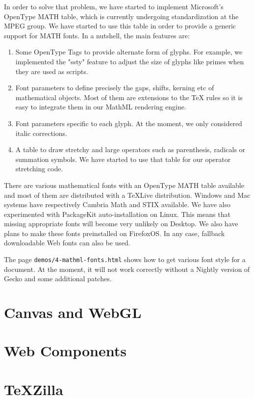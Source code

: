 In order to solve that problem, we have started to implement Microsoft's
OpenType MATH table, which is currently undergoing standardization at the
MPEG group. We have started to use this table in order to provide a generic
support for MATH fonts. In a nutshell, the main features are:

\begin{enumerate}

\item Some OpenType Tags to provide alternate form of glyphs. For example,
  we implemented the "ssty" feature to adjust the size of glyphs like primes
  when they are used as scripts.

\item Font parameters to define precisely the gaps, shifts, kerning etc of
  mathematical objects. Most of them are extensions to the TeX rules so it
  is easy to integrate them in our MathML rendering engine.

\item Font parameters specific to each glyph. At the moment, we only considered
  italic corrections.

\item A table to draw stretchy and large operators such as parenthesis,
  radicals or summation symbols. We have started to use that table for our
  operator stretching code.

\end{enumerate}

There are various mathematical fonts with an OpenType MATH table available and
most of them are distributed with a TeXLive distribution. Windows and Mac
systems have respectively Cambria Math and STIX available. We have also
experimented with PackageKit auto-installation on Linux. This means that
missing appropriate fonts will become very unlikely on Desktop. We also have
plans to make these fonts preinstalled on FirefoxOS. In any case, fallback
downloadable Web fonts can also be used.

The page {\tt demos/4-mathml-fonts.html} shows how to get various font style for
a document. At the moment, it will not work correctly without a Nightly
version of Gecko and some additional patches.

\section{Canvas and WebGL}



\section{Web Components}


\section{TeXZilla}

